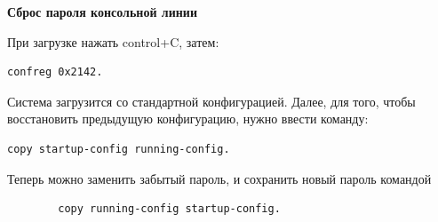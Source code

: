 \documentclass[a4paper,14pt]{extarticle}
\begin{document}
    \begin{center}
        \textbf{Сброс пароля консольной линии}
    \end{center}
    При загрузке нажать control+C, затем:
    \begin{lstlisting}
confreg 0x2142.
    \end{lstlisting} 
    Система загрузится со стандартной конфигурацией. Далее, для того, чтобы восстановить предыдущую конфигурацию, нужно ввести команду:
    \begin{lstlisting}
copy startup-config running-config. 
    \end{lstlisting}    
    Теперь можно заменить забытый пароль, и сохранить новый пароль командой 
    \begin{lstlisting}
        copy running-config startup-config.
    \end{lstlisting}
\end{document}
